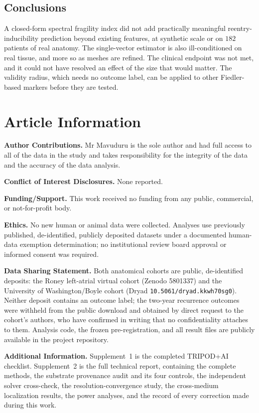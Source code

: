 \documentclass[11pt]{article}
\newcommand{\code}[1]{\texttt{#1}}
\begin{document}
\subsection*{Conclusions}

A closed-form spectral fragility index did not add practically meaningful
reentry-inducibility prediction beyond existing features, at synthetic scale or
on $182$ patients of real anatomy. The single-vector estimator is also
ill-conditioned on real tissue, and more so as meshes are refined. The clinical
endpoint was not met, and it could not have resolved an effect of the size that
would matter. The validity radius, which needs no outcome label, can be applied
to other Fiedler-based markers before they are tested.

\section*{Article Information}
\noindent\textbf{Author Contributions.} Mr Mavuduru is the sole author and had
full access to all of the data in the study and takes responsibility for the
integrity of the data and the accuracy of the data analysis.

\smallskip
\noindent\textbf{Conflict of Interest Disclosures.} None reported.

\smallskip
\noindent\textbf{Funding/Support.} This work received no funding from any public,
commercial, or not-for-profit body.

\smallskip
\noindent\textbf{Ethics.} No new human or animal data were collected. Analyses
use previously published, de-identified, publicly deposited datasets under a
documented human-data exemption determination; no institutional review board
approval or informed consent was required.

\smallskip
\noindent\textbf{Data Sharing Statement.} Both anatomical cohorts are public,
de-identified deposits: the Roney left-atrial virtual cohort (Zenodo 5801337)
and the University of Washington/Boyle cohort (Dryad
\code{10.5061/dryad.kkwh70sg0}). Neither deposit contains an outcome label; the
two-year recurrence outcomes were withheld from the public download and obtained
by direct request to the cohort's authors, who have confirmed in writing that no
confidentiality attaches to them. Analysis code, the frozen pre-registration,
and all result files are publicly available in the project repository.

\smallskip
\noindent\textbf{Additional Information.} Supplement~1 is the completed TRIPOD+AI
checklist. Supplement~2 is the full technical report, containing the complete
methods, the substrate provenance audit and its four controls, the independent
solver cross-check, the resolution-convergence study, the cross-medium
localization results, the power analyses, and the record of every correction
made during this work.
\end{document}
